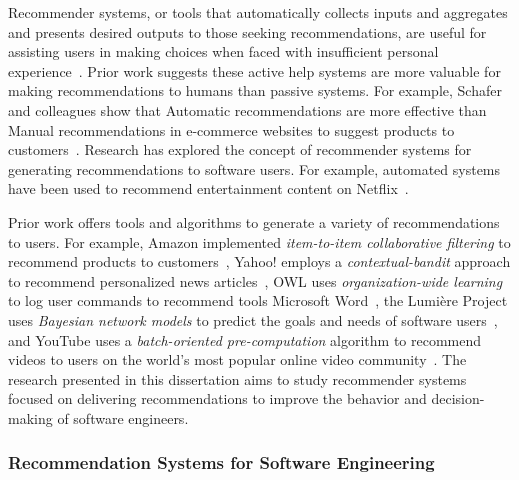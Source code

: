 Recommender systems, or tools that automatically collects inputs and aggregates and presents desired outputs to those seeking recommendations, are useful for assisting users in making choices when faced with insufficient personal experience~\cite{resnick1997recommender}. Prior work suggests these active help systems are more valuable for making recommendations to humans than passive systems. For example, Schafer and colleagues show that Automatic recommendations are more effective than Manual recommendations in e-commerce websites to suggest products to customers~\cite{schafer1999recommender}. Research has explored the concept of recommender systems for generating recommendations to software users. For example, automated systems have been used to recommend entertainment content on Netflix~\cite{Netflix}. 

Prior work offers tools and algorithms to generate a variety of recommendations to users. For example, Amazon implemented \textit{item-to-item collaborative filtering} to recommend products to customers~\cite{Amazon}, Yahoo! employs a \textit{contextual-bandit} approach to recommend personalized news articles~\cite{Yahoo}, OWL uses \textit{organization-wide learning} to log user commands to recommend tools Microsoft Word~\cite{OWL}, the Lumi\`ere Project uses \textit{Bayesian network models} to predict the goals and needs of software users~\cite{HorvitzLumiere}, and YouTube uses a \textit{batch-oriented pre-computation} algorithm to recommend videos to users on the world's most popular online video community~\cite{YouTube}. The research presented in this dissertation aims to study recommender systems focused on delivering recommendations to improve the behavior and decision-making of software engineers.

\subsubsection{Recommendation Systems for Software Engineering}

